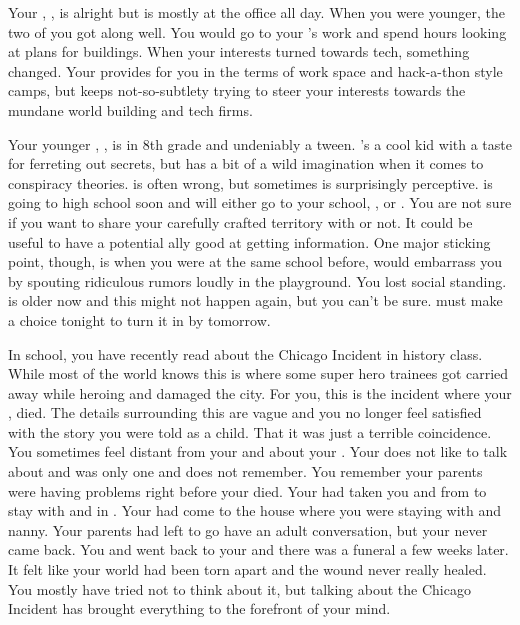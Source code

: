 \documentclass[char]{LRSguildcamp1}
\begin{document}
Your \cArchitect{\parent}, \cArchitect{}, is alright but is mostly at the office all day. When you were younger, the two of you got along well. You would go to your \cArchitect{\parent}'s work and spend hours looking at plans for buildings. When your interests turned towards tech, something changed. Your \cArchitect{\parent} provides for you in the terms of work space and hack-a-thon style camps, but keeps not-so-subtlety trying to steer your interests towards the mundane world building and tech firms. 

Your younger \cTween{\sibling}, \cTween{}, is in 8th grade and undeniably a tween. \cTween{}'s a cool kid with a taste for ferreting out secrets, but has a bit of a wild imagination when it comes to conspiracy theories. \cTween{\They} is often wrong, but sometimes is surprisingly perceptive. \cTween{} is going to high school soon and will either go to your school, \pNormalSchool{}, or \pSuperSchool{}. You are not sure if you want to share your carefully crafted territory with \cTween{\them} or not. It could be useful to have a potential ally good at getting information. One major sticking point, though, is when you were at the same school before, \cTween{} would embarrass you by spouting ridiculous rumors loudly in the playground. You lost social standing. \cTween{} is older now and this might not happen again, but you can't be sure. \cTween{} must make a choice tonight to turn it in by tomorrow.

In school, you have recently read about the Chicago Incident in history class. While most of the world knows this is where some super hero trainees got carried away while heroing and damaged the city. For you, this is the incident where your \cAS{\parent},\cAS{} died. The details surrounding this are vague and you no longer feel satisfied with the story you were told as a child. That it was just a terrible coincidence. You sometimes feel distant from your\cArchitect{\parent} and \cTween{} about your \cAS{\parent}. Your \cArchitect{\parent} does not like to talk about \cAS{} and \cTween{} was only one and does not remember. You remember your parents were having problems right before your \cAS{\parent} died. Your \cAS{\parent} had taken you and \cTween{} from \pCityArchitect{} to stay with \cOS{} and \cGrad{} in \pCityO{}. Your \cArchitect{\parent} had come to the house where you were staying with \cGrad{} and \cGrad{\their} nanny. Your parents had left to go have an adult conversation, but your \cAS{\parent} never came back. You and \cTween{} went back to your \pCityArchitect{} and there was a funeral a few weeks later. It felt like your world had been torn apart and the wound never really healed. You mostly have tried not to think about it, but talking about the Chicago Incident has brought everything to the forefront of your mind.
\end{document}
